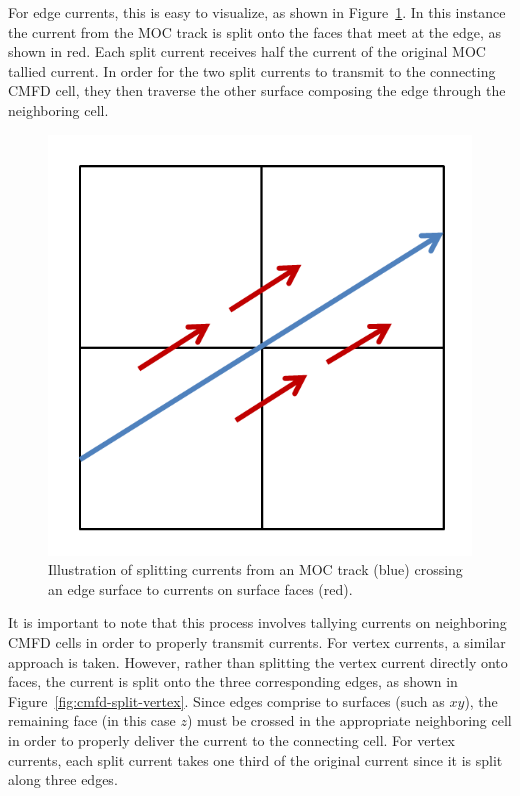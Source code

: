 For edge currents, this is easy to visualize, as shown in Figure~\ref{fig:cmfd-split-edge}. In this instance the current from the \ac{MOC} track is split onto the faces that meet at the edge, as shown in red. Each split current receives half the current of the original \ac{MOC} tallied current. In order for the two split currents to transmit to the connecting \ac{CMFD} cell, they then traverse the other surface composing the edge through the neighboring cell.

\begin{figure}[h!]
	\centering
	\includegraphics[width=0.6\linewidth]{figures/DD/edge-split.PNG}
	\caption[]{Illustration of splitting currents from an \ac{MOC} track (blue) crossing an edge surface to currents on surface faces (red).}
	\label{fig:cmfd-split-edge}
\end{figure}

\newpage
It is important to note that this process involves tallying currents on neighboring \ac{CMFD} cells in order to properly transmit currents. For vertex currents, a similar approach is taken. However, rather than splitting the vertex current directly onto faces, the current is split onto the three corresponding edges, as shown in Figure~\ref{fig:cmfd-split-vertex}. Since edges comprise to surfaces (such as $xy$), the remaining face (in this case $z$) must be crossed in the appropriate neighboring cell in order to properly deliver the current to the connecting cell. For vertex currents, each split current takes one third of the original current since it is split along three edges.

